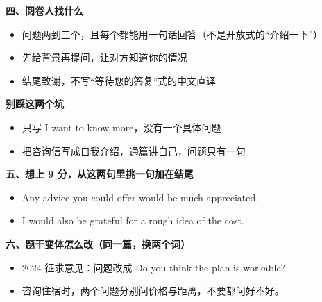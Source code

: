 \documentclass[11pt,a4paper]{ctexart}
\begin{document}
\vspace{5pt}
\noindent\begin{minipage}[t]{0.555\linewidth}
{\color{accent}\bfseries 四、阅卷人找什么}\par
{\footnotesize\begin{itemize}[leftmargin=1.2em,itemsep=1pt,topsep=1pt,parsep=0pt]\setlength{\leftmargin}{1.1em}
\item 问题两到三个，且每个都能用一句话回答（不是开放式的“介绍一下”）
\item 先给背景再提问，让对方知道你的情况
\item 结尾致谢，不写“等待您的答复”式的中文直译
\end{itemize}}
\end{minipage}\hfill
\begin{minipage}[t]{0.415\linewidth}
{\color{hot}\bfseries 别踩这两个坑}\par
{\footnotesize\begin{itemize}[leftmargin=1.2em,itemsep=1pt,topsep=1pt,parsep=0pt]\setlength{\leftmargin}{1.1em}
\item 只写 I want to know more，没有一个具体问题
\item 把咨询信写成自我介绍，通篇讲自己，问题只有一句
\end{itemize}}
\end{minipage}\par

\vspace{6pt}
{\color{accent}\bfseries 五、想上 9 分，从这两句里挑一句加在结尾}\par
\vspace{2pt}
{\footnotesize
\begin{itemize}[leftmargin=1.2em,itemsep=1.5pt,topsep=1pt,parsep=0pt]
\item Any advice you could offer would be much appreciated.
\item I would also be grateful for a rough idea of the cost.
\end{itemize}}\par

\vspace{6pt}
{\color{accent}\bfseries 六、题干变体怎么改（同一篇，换两个词）}\par
\vspace{2pt}
{\footnotesize
\begin{itemize}[leftmargin=1.2em,itemsep=1.5pt,topsep=1pt,parsep=0pt]
\item 2024 征求意见：问题改成 Do you think the plan is workable?
\item 咨询住宿时，两个问题分别问价格与距离，不要都问好不好。
\end{itemize}}\par
\end{document}
